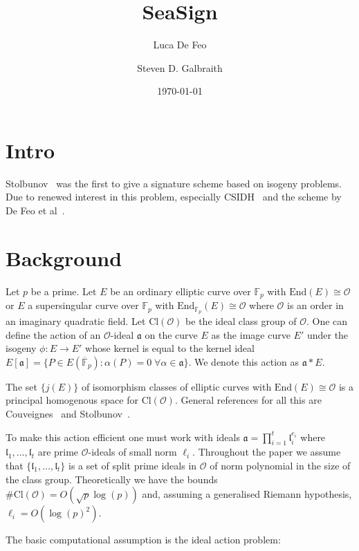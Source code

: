 \documentclass{llncs}
\title{SeaSign}
\author{Luca De Feo \and Steven D. Galbraith}
\institute{Mathematics Department, University of Auckland, NZ.
\email{s.galbraith@auckland.ac.nz}}
\date{\today}
\newcommand{\F}{\mathbb{F}}
\newcommand{\Fpbar}{\overline{\mathbb{F}}_p}
\newcommand{\OO}{\mathcal{O}}
\newcommand{\End}{\text{End}}
\newcommand{\Cl}{\text{Cl}}
\renewcommand{\a}{\mathfrak{a}}
\renewcommand{\l}{\mathfrak{l}}
\begin{document}
\pagestyle{plain}

\maketitle


\begin{abstract}

\end{abstract}



\section{Intro}

Stolbunov~\cite{Sto12} was the first to give a signature scheme based on isogeny problems.
Due to renewed interest in this problem, especially CSIDH~\cite{CLMPR18} and the scheme by De Feo et al~\cite{DFKS18}.


\section{Background}

Let $p$ be a prime.
Let $E$ be an ordinary elliptic curve over $\F_p$ with $\End(E) \cong \OO$ or $E$ a supersingular curve over $\F_p$ with $\End_{\F_p}(E) \cong \OO$ where $\OO$ is an order in an imaginary quadratic field.
Let $\Cl(\OO )$ be the ideal class group of $\OO$.
One can define the action of an $\OO$-ideal $\a$ on the curve $E$ as the image curve $E'$ under the isogeny $\phi : E \to E'$ whose kernel is equal to the kernel ideal $E[ \a ] = \{ P \in E( \Fpbar ) : \alpha(P) = 0 \; \forall \alpha \in \a \}$.
We denote this action as $\a * E$.

The set $\{ j(E) \}$ of isomorphism classes of elliptic curves with $\End(E) \cong \OO$ is a principal homogenous space for $\Cl(\OO )$.
General references for all this are Couveignes~\cite{Couv06}
and Stolbunov~\cite{Sto12}.

To make this action efficient one must work with ideals $\a = \prod_{i=1}^t \l_i^{e_i}$ where $\l_1, \dots, \l_t$ are prime $\OO$-ideals of small norm $\ell_i$.
Throughout the paper we assume that $\{ \l_1, \dots, \l_t \}$ is a set of split prime ideals in $\OO$ of norm polynomial in the size of the class group.
Theoretically we have the bounds $\#\Cl(\OO) = O( \sqrt{p} \log(p) )$ and, assuming a generalised Riemann hypothesis, $\ell_i = O( \log(p)^2 )$.

The basic computational assumption is the ideal action problem:
\end{document}
